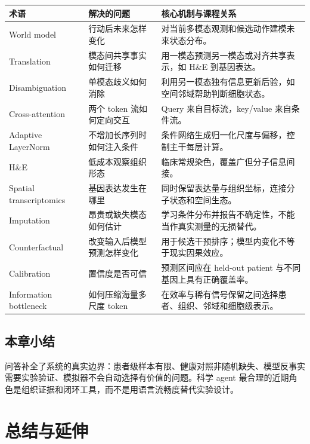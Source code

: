 \documentclass[a4paper]{article}
\begin{document}
\begin{center}
\small
\begin{tabularx}{\textwidth}{p{} X X}
\toprule
\textbf{术语} & \textbf{解决的问题} & \textbf{核心机制与课程关系} \\
\midrule
World model & 行动后未来怎样变化 & 对当前多模态观测和候选动作建模未来状态分布。 \\
Translation & 模态间共享事实如何迁移 & 用一模态预测另一模态或对齐共享表示，如 H\&E 到基因表达。 \\
Disambiguation & 单模态歧义如何消除 & 利用另一模态独有信息更新后验，如空间邻域帮助判断细胞状态。 \\
Cross-attention & 两个 token 流如何定向交互 & Query 来自目标流，key/value 来自条件流。 \\
Adaptive LayerNorm & 不增加长序列时如何注入条件 & 条件网络生成归一化尺度与偏移，控制主干每层计算。 \\
H\&E & 低成本观察组织形态 & 临床常规染色，覆盖广但分子信息间接。 \\
Spatial transcriptomics & 基因表达发生在哪里 & 同时保留表达量与组织坐标，连接分子状态和空间生态。 \\
Imputation & 昂贵或缺失模态如何估计 & 学习条件分布并报告不确定性，不能当作真实测量的无损替代。 \\
Counterfactual & 改变输入后模型预测怎样变化 & 用于候选干预排序；模型内变化不等于现实因果效应。 \\
Calibration & 置信度是否可信 & 预测区间应在 held-out patient 与不同基因上具有正确覆盖率。 \\
Information bottleneck & 如何压缩海量多尺度 token & 在效率与稀有信号保留之间选择患者、组织、邻域和细胞级表示。 \\
\bottomrule
\end{tabularx}
\end{center}

\subsection{本章小结}

问答补全了系统的真实边界：患者级样本有限、健康对照非随机缺失、模型反事实需要实验验证、模拟器不会自动选择有价值的问题。科学 agent 最合理的近期角色是组织证据和闭环工具，而不是用语言流畅度替代实验设计。

\section{总结与延伸}
\end{document}
